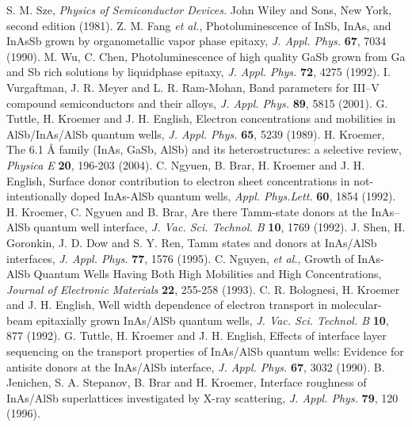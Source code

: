\documentclass[titlepage,a4paper]{book}
\begin{document}
\begin{thebibliography}{99}
S. M. Sze, \textit{Physics of Semiconductor Devices.} John Wiley and Sons, New York, second edition (1981).
Z. M. Fang \textit{et al.}, Photoluminescence of InSb, InAs, and InAsSb grown by organometallic vapor phase epitaxy, \textit{J. Appl. Phys.} \textbf{67}, 7034 (1990).
M. Wu, C. Chen, Photoluminescence of high quality GaSb grown from Ga and Sb rich solutions by liquidphase epitaxy, \textit{J. Appl. Phys.} \textbf{72}, 4275 (1992).
I. Vurgaftman, J. R. Meyer and L. R. Ram-Mohan, Band parameters for III–V compound semiconductors and their alloys, \textit{J. Appl. Phys.} \textbf{89}, 5815 (2001).
G. Tuttle, H. Kroemer and J. H. English, Electron concentrations and mobilities in AlSb/InAs/AlSb quantum wells, \textit{J. Appl. Phys.} \textbf{65}, 5239 (1989).
H. Kroemer, The 6.1 Å family (InAs, GaSb, AlSb) and its heterostructures: a selective review, \textit{Physica E} \textbf{20}, 196-203 (2004). 
C. Ngyuen, B. Brar, H. Kroemer and J. H. English, Surface donor contribution to electron sheet concentrations in not-intentionally doped InAs-AlSb quantum wells, \textit{Appl. Phys.Lett.} \textbf{60}, 1854 (1992).
H. Kroemer, C. Ngyuen and B. Brar, Are there Tamm-state donors at the InAs–AlSb quantum well interface, \textit{J. Vac. Sci. Technol. B} \textbf{10}, 1769 (1992). 
J. Shen, H. Goronkin, J. D. Dow and S. Y. Ren, Tamm states and donors at InAs/AlSb interfaces, \textit{J. Appl. Phys.} \textbf{77}, 1576 (1995).
C. Nguyen, \textit{et al.}, Growth of InAs-AlSb Quantum Wells Having Both High Mobilities and High Concentrations, \textit{Journal of Electronic Materials} \textbf{22}, 255-258 (1993).
C. R. Bolognesi, H. Kroemer and J. H. English, Well width dependence of electron transport in molecular-beam epitaxially grown InAs/AlSb quantum wells, \textit{J. Vac. Sci. Technol. B} \textbf{10}, 877 (1992).
G. Tuttle, H. Kroemer and J. H. English, Effects of interface layer sequencing on the transport properties of InAs/AlSb quantum wells: Evidence for antisite donors at the InAs/AlSb interface, \textit{J. Appl. Phys.} \textbf{67}, 3032 (1990).
B. Jenichen, S. A. Stepanov, B. Brar and H. Kroemer, Interface roughness of InAs/AlSb superlattices investigated by X-ray scattering, \textit{J. Appl. Phys.} \textbf{79}, 120 (1996).

\end{thebibliography}
\end{document}
